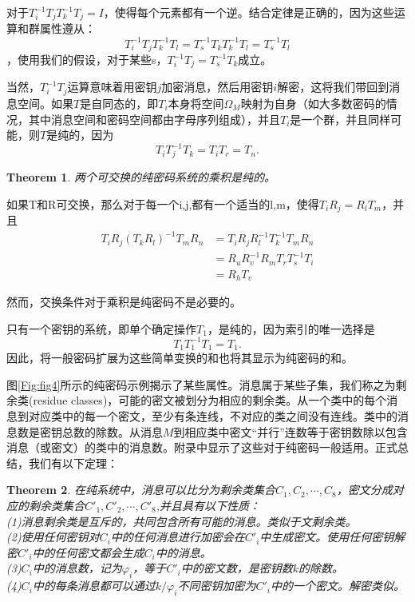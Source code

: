 \documentclass[]{article}
\newtheorem{theorem}{Theorem}
\begin{document}
对于$T^{-1}_i T_j T^{-1}_k T_j =  I$，使得每个元素都有一个逆。结合定律是正确的，因为这些运算和群属性遵从：
\[T^{-1}_i T_j T^{-1}_k T_l = T^{-1}_s T_k T^{-1}_k T_l = T^{-1}_s T_l\]
，使用我们的假设，对于某些s，$T^{-1}_i T_j= T^{-1}_s T_k$成立。

当然，$T^{-1}_iT_j$运算意味着用密钥$j$加密消息，然后用密钥$i$解密，这将我们带回到消息空间。如果$T$是自同态的，即$T_i$本身将空间$\Omega_M$映射为自身（如大多数密码的情况，其中消息空间和密码空间都由字母序列组成），并且$T_i$是一个群，并且同样可能，则$T$是纯的，因为\[T_iT^{-1}_jT_k=T_iT_r=T_n.\]

\begin{theorem}
	两个可交换的纯密码系统的乘积是纯的。
\end{theorem}

如果T和R可交换，那么对于每一个i,j,都有一个适当的l,m，使得$T_i R_j= R_l T_m$，并且
\begin{equation}
	\begin{aligned}
		T_iR_j(T_kR_l)^{-1}T_mR_n &=T_i R_j R^{-1}_l T^{-1}_k T_m R_n \\
		                          &=R_u R^{-1}_vR_mT_rT^{-1}_sT_i\\
		                          &=R_hT_v
	\end{aligned}
\end{equation}

然而，交换条件对于乘积是纯密码不是必要的。


只有一个密钥的系统，即单个确定操作$T_1$，是纯的，因为索引的唯一选择是\[T_1T^{-1}_1T_1=T_1.\]
因此，将一般密码扩展为这些简单变换的和也将其显示为纯密码的和。

图\ref{Fig:fig4}所示的纯密码示例揭示了某些属性。消息属于某些子集，我们称之为剩余类(residue classes)，可能的密文被划分为相应的剩余类。从一个类中的每个消息到对应类中的每一个密文，至少有条连线，不对应的类之间没有连线。类中的消息数是密钥总数的除数。从消息$M$到相应类中密文“并行”连数等于密钥数除以包含消息（或密文）的类中的消息数。附录中显示了这些对于纯密码一般适用。正式总结，我们有以下定理：

\begin{theorem}\label{source:theorem3}
	在纯系统中，消息可以比分为剩余类集合$C_1,C_2,\cdots,C_8$，密文分成对应的剩余类集合$C'_1,C'_2,\cdots,C'_8$,并且具有以下性质：\\
	(1)消息剩余类是互斥的，共同包含所有可能的消息。类似于文剩余类。\\
	(2)使用任何密钥对$C_i$中的任何消息进行加密会在$C'_i$中生成密文。使用任何密钥解密$C'_i$中的任何密文都会生成$C_i$中的消息。\\
	(3)$C_i$中的消息数，记为$\varphi_i$，等于$C'_i$中的密文数，是密钥数$k$的除数。\\
	(4)$C_i$中的每条消息都可以通过$k/\varphi_i$不同密钥加密为$C'_i$中的一个密文。解密类似。
\end{theorem}
\end{document}
